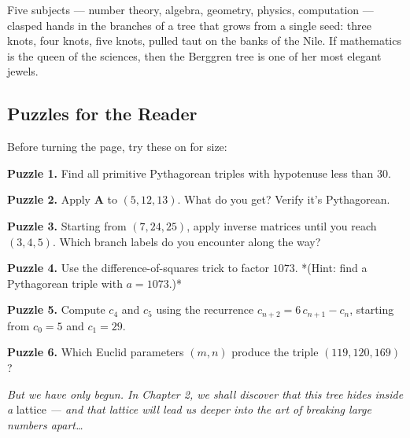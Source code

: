 Five subjects --- number theory, algebra, geometry, physics, computation --- clasped hands in the branches of a tree that grows from a single seed: three knots, four knots, five knots, pulled taut on the banks of the Nile. If mathematics is the queen of the sciences, then the Berggren tree is one of her most elegant jewels.

\bigskip

\subsection*{Puzzles for the Reader}

Before turning the page, try these on for size:


\begin{displayquote}
\textbf{Puzzle 1.} Find all primitive Pythagorean triples with hypotenuse less than $30$.
\end{displayquote}



\begin{displayquote}
\textbf{Puzzle 2.} Apply $\mathbf{A}$ to $(5, 12, 13)$. What do you get? Verify it's Pythagorean.
\end{displayquote}



\begin{displayquote}
\textbf{Puzzle 3.} Starting from $(7, 24, 25)$, apply inverse matrices until you reach $(3, 4, 5)$. Which branch labels do you encounter along the way?
\end{displayquote}



\begin{displayquote}
\textbf{Puzzle 4.} Use the difference-of-squares trick to factor $1073$. *(Hint: find a Pythagorean triple with $a = 1073$.)*
\end{displayquote}



\begin{displayquote}
\textbf{Puzzle 5.} Compute $c_4$ and $c_5$ using the recurrence $c_{n+2} = 6\,c_{n+1} - c_n$, starting from $c_0 = 5$ and $c_1 = 29$.
\end{displayquote}



\begin{displayquote}
\textbf{Puzzle 6.} Which Euclid parameters $(m, n)$ produce the triple $(119, 120, 169)$?
\end{displayquote}


\bigskip

\textit{But we have only begun. In Chapter 2, we shall discover that this tree hides inside a} lattice \textit{--- and that lattice will lead us deeper into the art of breaking large numbers apart…}

